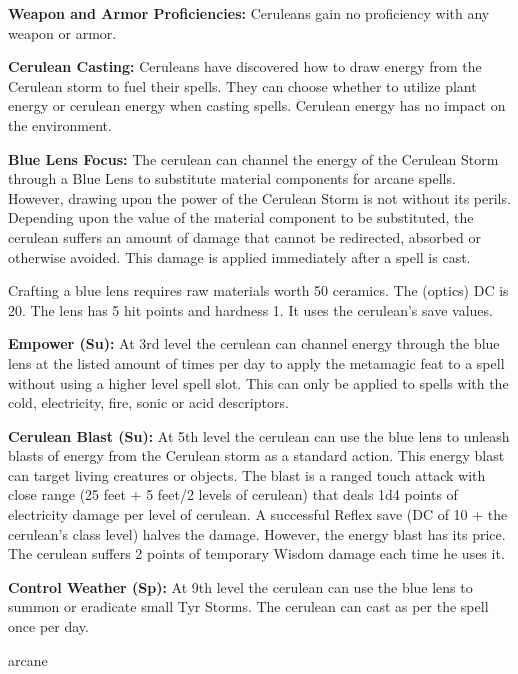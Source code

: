 {
\textbf{Weapon and Armor Proficiencies:} Ceruleans gain no proficiency with any weapon or armor.

\textbf{Cerulean Casting:} Ceruleans have discovered how to draw energy from the Cerulean storm to fuel their spells. They can choose whether to utilize plant energy or cerulean energy when casting spells. Cerulean energy has no impact on the environment.

\textbf{Blue Lens Focus:} The cerulean can channel the energy of the Cerulean Storm through a Blue Lens to substitute material components for arcane spells. However, drawing upon the power of the Cerulean Storm is not without its perils. Depending upon the value of the material component to be substituted, the cerulean suffers an amount of damage that cannot be redirected, absorbed or otherwise avoided. This damage is applied immediately after a spell is cast.


Crafting a blue lens requires raw materials worth 50 ceramics. The  (optics) DC is 20. The lens has 5 hit points and hardness 1. It uses the cerulean's save values.

\textbf{Empower (Su):} At 3rd level the cerulean can channel energy through the blue lens at the listed amount of times per day to apply the metamagic feat  to a spell without using a higher level spell slot. This can only be applied to spells with the cold, electricity, fire, sonic or acid descriptors.

\textbf{Cerulean Blast (Su):} At 5th level the cerulean can use the blue lens to unleash blasts of energy from the Cerulean storm as a standard action. This energy blast can target living creatures or objects. The blast is a ranged touch attack with close range (25 feet + 5 feet/2 levels of cerulean) that deals 1d4 points of electricity damage per level of cerulean. A successful Reflex save (DC of 10 + the cerulean's class level) halves the damage. However, the energy blast has its price. The cerulean suffers 2 points of temporary Wisdom damage each time he uses it.

\textbf{Control Weather (Sp):} At 9th level the cerulean can use the blue lens to summon or eradicate small Tyr Storms. The cerulean can cast  as per the spell once per day.
}
{}
{arcane}
{}
{}
{}